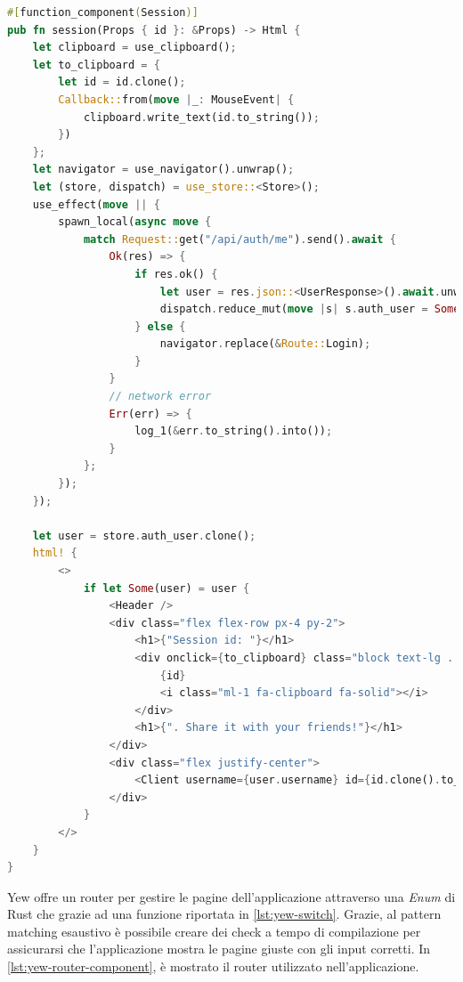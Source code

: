 \documentclass{article}
\begin{document}
\begin{lstlisting}[language=Rust, style=boxed, label={lst:yew-function-component}, captionpos=b,caption={Esempio di componente funzionale}]
#[function_component(Session)]
pub fn session(Props { id }: &Props) -> Html {
    let clipboard = use_clipboard();
    let to_clipboard = {
        let id = id.clone();
        Callback::from(move |_: MouseEvent| {
            clipboard.write_text(id.to_string());
        })
    };
    let navigator = use_navigator().unwrap();
    let (store, dispatch) = use_store::<Store>();
    use_effect(move || {
        spawn_local(async move {
            match Request::get("/api/auth/me").send().await {
                Ok(res) => {
                    if res.ok() {
                        let user = res.json::<UserResponse>().await.unwrap();
                        dispatch.reduce_mut(move |s| s.auth_user = Some(user.into()));
                    } else {
                        navigator.replace(&Route::Login);
                    }
                }
                // network error
                Err(err) => {
                    log_1(&err.to_string().into());
                }
            };
        });
    });

    let user = store.auth_user.clone();
    html! {
        <>
            if let Some(user) = user {
                <Header />
                <div class="flex flex-row px-4 py-2">
                    <h1>{"Session id: "}</h1>
                    <div onclick={to_clipboard} class="block text-lg ... altre classi">
                        {id}
                        <i class="ml-1 fa-clipboard fa-solid"></i>
                    </div>
                    <h1>{". Share it with your friends!"}</h1>
                </div>
                <div class="flex justify-center">
                    <Client username={user.username} id={id.clone().to_string()}/>
                </div>
            }
        </>
    }
}
\end{lstlisting}
Yew offre un router per gestire le pagine dell'applicazione attraverso una \textit{Enum} di 
Rust che grazie ad una funzione riportata in \cref{lst:yew-switch}. Grazie, al pattern matching esaustivo è possibile creare dei check a tempo di compilazione 
per assicurarsi che l'applicazione mostra le pagine giuste con gli input corretti. In
\cref{lst:yew-router-component}, è mostrato il router utilizzato nell'applicazione. 
\end{document}
